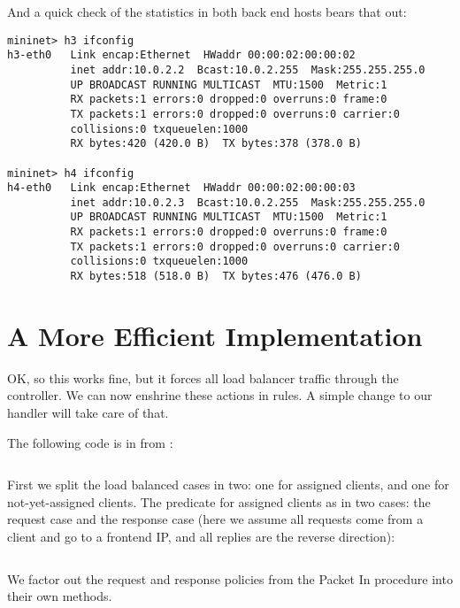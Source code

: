 And a quick check of the statistics in both back end hosts bears that out:

\begin{verbatim}
mininet> h3 ifconfig
h3-eth0   Link encap:Ethernet  HWaddr 00:00:02:00:00:02
          inet addr:10.0.2.2  Bcast:10.0.2.255  Mask:255.255.255.0
          UP BROADCAST RUNNING MULTICAST  MTU:1500  Metric:1
          RX packets:1 errors:0 dropped:0 overruns:0 frame:0
          TX packets:1 errors:0 dropped:0 overruns:0 carrier:0
          collisions:0 txqueuelen:1000
          RX bytes:420 (420.0 B)  TX bytes:378 (378.0 B)

mininet> h4 ifconfig
h4-eth0   Link encap:Ethernet  HWaddr 00:00:02:00:00:03
          inet addr:10.0.2.3  Bcast:10.0.2.255  Mask:255.255.255.0
          UP BROADCAST RUNNING MULTICAST  MTU:1500  Metric:1
          RX packets:1 errors:0 dropped:0 overruns:0 frame:0
          TX packets:1 errors:0 dropped:0 overruns:0 carrier:0
          collisions:0 txqueuelen:1000
          RX bytes:518 (518.0 B)  TX bytes:476 (476.0 B)
\end{verbatim}

\section{A More Efficient Implementation}

OK, so this works fine, but it forces all load balancer traffic through the controller.  We can
now enshrine these actions in rules.  A simple change to our  handler will take
care of that.  

The following code is in from 
:

\inputminted[firstline=75,lastline=85]{python}{code/routing_variants/load_balancer_handler2.py} 

First we split the load balanced cases in two: one for assigned clients, and one for not-yet-assigned
clients.  The predicate for assigned clients as in two cases: the request case and the response case 
(here we assume all requests come from a client and go to a frontend IP, and all replies are the
reverse direction):

\inputminted[firstline=19,lastline=27]{python}{code/routing_variants/load_balancer_handler2.py} 

We factor out the request and response policies from the Packet In procedure into their own methods.

\inputminted[firstline=29,lastline=52]{python}{code/routing_variants/load_balancer_handler2.py} 

